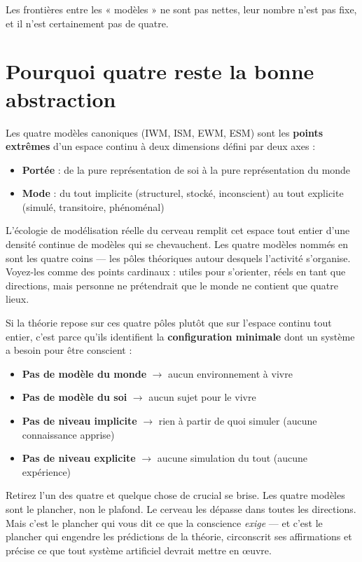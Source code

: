 \documentclass[11pt, twoside, openright]{book}
\begin{document}
Les frontières entre les « modèles » ne sont pas nettes, leur nombre n'est pas fixe, et il n'est certainement pas de quatre.

\section*{Pourquoi quatre reste la bonne abstraction}

Les quatre modèles canoniques (IWM, ISM, EWM, ESM) sont les \textbf{points extrêmes} d'un espace continu à deux dimensions défini par deux axes :

\begin{itemize}
  \item \textbf{Portée} : de la pure représentation de soi à la pure représentation du monde
  \item \textbf{Mode} : du tout implicite (structurel, stocké, inconscient) au tout explicite (simulé, transitoire, phénoménal)
\end{itemize}

L'écologie de modélisation réelle du cerveau remplit cet espace tout entier d'une densité continue de modèles qui se chevauchent. Les quatre modèles nommés en sont les quatre coins --- les pôles théoriques autour desquels l'activité s'organise. Voyez-les comme des points cardinaux : utiles pour s'orienter, réels en tant que directions, mais personne ne prétendrait que le monde ne contient que quatre lieux.

Si la théorie repose sur ces quatre pôles plutôt que sur l'espace continu tout entier, c'est parce qu'ils identifient la \textbf{configuration minimale} dont un système a besoin pour être conscient :

\begin{itemize}
  \item \textbf{Pas de modèle du monde} $\rightarrow$ aucun environnement à vivre
  \item \textbf{Pas de modèle du soi} $\rightarrow$ aucun sujet pour le vivre
  \item \textbf{Pas de niveau implicite} $\rightarrow$ rien à partir de quoi simuler (aucune connaissance apprise)
  \item \textbf{Pas de niveau explicite} $\rightarrow$ aucune simulation du tout (aucune expérience)
\end{itemize}

Retirez l'un des quatre et quelque chose de crucial se brise. Les quatre modèles sont le plancher, non le plafond. Le cerveau les dépasse dans toutes les directions. Mais c'est le plancher qui vous dit ce que la conscience \textit{exige} --- et c'est le plancher qui engendre les prédictions de la théorie, circonscrit ses affirmations et précise ce que tout système artificiel devrait mettre en œuvre.
\end{document}
